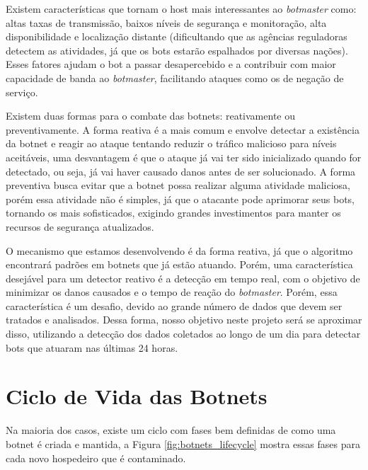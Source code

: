 Existem características que tornam o host mais interessantes ao \textit{botmaster} como: altas taxas de transmissão, baixos níveis de segurança e monitoração, alta disponibilidade e localização distante (dificultando que as agências reguladoras detectem as atividades, já que os bots estarão espalhados por diversas nações). Esses fatores ajudam o bot a passar desapercebido e a contribuir com maior capacidade de banda ao \textit{botmaster}, facilitando ataques como os de negação de serviço.

Existem duas formas para o combate das botnets: reativamente ou preventivamente. A forma reativa é a mais comum e envolve detectar a existência da botnet e reagir ao ataque tentando reduzir o tráfico malicioso para níveis aceitáveis, uma desvantagem é que o ataque já vai ter sido inicializado quando for detectado, ou seja, já vai haver causado danos antes de ser solucionado. A forma preventiva busca evitar que a botnet possa realizar alguma atividade maliciosa, porém essa atividade não é simples, já que o atacante pode aprimorar seus bots, tornando os mais sofisticados, exigindo grandes investimentos para manter os recursos de segurança atualizados.

O mecanismo que estamos desenvolvendo é da forma reativa, já que o algoritmo encontrará padrões em botnets que já estão atuando. Porém, uma característica desejável para um detector reativo é a detecção em tempo real, com o objetivo de minimizar os danos causados e o tempo de reação do \textit{botmaster}. Porém, essa característica é um desafio, devido ao grande número de dados que devem ser tratados e analisados. Dessa forma, nosso objetivo neste projeto será se aproximar disso, utilizando a detecção dos dados coletados ao longo de um dia para detectar bots que atuaram nas últimas 24 horas.

\section{Ciclo de Vida das Botnets}
Na maioria dos casos, existe um ciclo com fases bem definidas de como uma botnet é criada e mantida, a Figura \ref{fig:botnets_lifecycle} mostra essas fases para cada novo hospedeiro que é contaminado.

